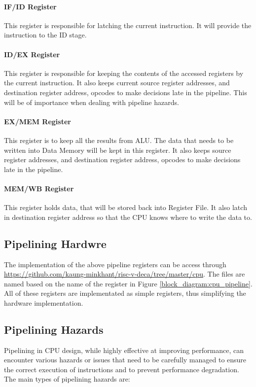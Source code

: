 \paragraph*{IF/ID Register}
This register is responsible for latching the current instruction. It will provide the instruction to the ID stage.

\paragraph*{ID/EX Register}
This register is responsible for keeping the contents of the accessed registers by the current instruction.
It also keeps current source register addresses, and destination register address, opcodes to make decisions late in the pipeline.
This will be of importance when dealing with pipeline hazards.

\paragraph*{EX/MEM Register}
This register is to keep all the results from ALU.
The data that needs to be written into Data Memory will be kept in this register.
It also keeps source register addresses, and destination register address, opcodes to make decisions late in the pipeline.

\paragraph*{MEM/WB Register}
This register holds data, that will be stored back into Register File.
It also latch in destination register address so that the CPU knows where to write the data to.

\subsection{Pipelining Hardwre}
The implementation of the above pipeline registers can be access through \url{https://github.com/kaung-minkhant/risc-v-deca/tree/master/cpu}.
The files are named based on the name of the register in Figure \ref{block_diagram:cpu_pipeline}.
All of these registers are implementated as simple registers, thus simplifying the hardware implementation.

\subsection{Pipelining Hazards}
Pipelining in CPU design, while highly effective at improving performance,
can encounter various hazards or issues that need to be carefully managed to ensure the correct execution of instructions
and to prevent performance degradation. The main types of pipelining hazards are:

